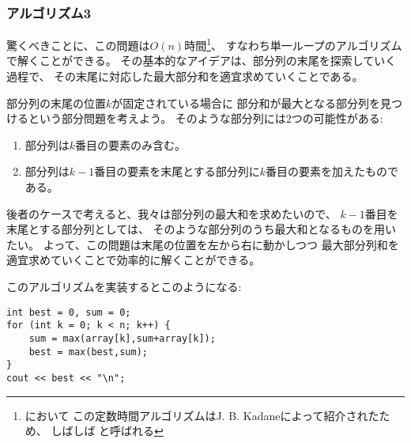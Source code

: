 \subsubsection{アルゴリズム3}

驚くべきことに、この問題は$O(n)$時間\footnote{\cite{ben86}において
この定数時間アルゴリズムはJ. B. Kadaneによって紹介されたため、
しばしば と呼ばれる}、
すなわち単一ループのアルゴリズムで解くことができる。
その基本的なアイデアは、部分列の末尾を探索していく過程で、
その末尾に対応した最大部分和を適宜求めていくことである。

部分列の末尾の位置$k$が固定されている場合に
部分和が最大となる部分列を見つけるという部分問題を考えよう。
そのような部分列には2つの可能性がある:
\begin{enumerate}
\item 部分列は$k$番目の要素のみ含む。
\item 部分列は$k-1$番目の要素を末尾とする部分列に$k$番目の要素を加えたものである。
\end{enumerate}

\begin{comment}
In the latter case, since we want to
find a subarray with maximum sum,
the subarray that ends at position $k-1$
should also have the maximum sum.
Thus, we can solve the problem efficiently
by calculating the maximum subarray sum
for each ending position from left to right.

The following code implements the algorithm:
\end{comment}

後者のケースで考えると、我々は部分列の最大和を求めたいので、
$k-1$番目を末尾とする部分列としては、
そのような部分列のうち最大和となるものを用いたい。
よって、この問題は末尾の位置を左から右に動かしつつ
最大部分列和を適宜求めていくことで効率的に解くことができる。

このアルゴリズムを実装するとこのようになる:

\begin{lstlisting}
int best = 0, sum = 0;
for (int k = 0; k < n; k++) {
    sum = max(array[k],sum+array[k]);
    best = max(best,sum);
}
cout << best << "\n";
\end{lstlisting}

\begin{comment}
The algorithm only contains one loop
that goes through the input,
so the time complexity is $O(n)$.
This is also the best possible time complexity,
because any algorithm for the problem
has to examine all array elements at least once.
\end{comment}

